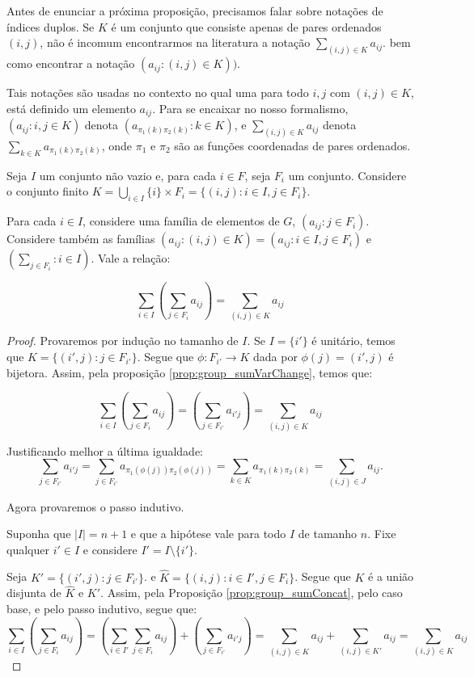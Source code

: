 Antes de enunciar a próxima proposição, precisamos falar sobre notações de índices duplos.
Se $K$ é um conjunto que consiste apenas de pares ordenados $(i, j)$, não é incomum encontrarmos na literatura a notação $\sum_{(i, j)\in K}a_{ij}$.
bem como encontrar a notação $(a_{ij}:(i, j)\in K))$.

Tais notações são usadas no contexto no qual uma para todo $i, j$ com $(i, j)\in K$, está definido um elemento $a_{ij}$.
Para se encaixar no nosso formalismo, $(a_{ij}:i, j \in K)$ denota $(a_{\pi_1(k)\pi_2(k)}: k \in K)$, e $\sum_{(i, j)\in K}a_{ij}$ denota $\sum_{k \in K}a_{\pi_1(k)\pi_2(k)}$, onde $\pi_1$ e $\pi_2$ são as funções coordenadas de pares ordenados.

\begin{prop}\label{prop:group_sumConcatII}
    Seja $I$ um conjunto não vazio e, para cada $i \in F$, seja $F_i$ um conjunto.
    Considere o conjunto finito $K=\bigcup_{i \in I}\{i\}\times F_i=\{(i, j): i \in I, j \in F_i\}$.

    Para cada $i \in I$, considere uma família de elementos de $G$, $(a_{ij}: j \in F_i)$.
    Considere também as famílias $(a_{ij}: (i, j)\in K)=(a_{ij}: i\in I, j \in F_i)$ e $(\sum_{j \in F_i}: i\in I)$. Vale a relação:

    \[\sum_{i \in I}\left(\sum_{j \in F_i}a_{ij}\right)=\sum_{(i, j)\in K}a_{ij}\]
\end{prop}
\begin{proof}
    Provaremos por indução no tamanho de $I$.
    Se $I=\{i'\}$ é unitário, temos que $K=\{(i', j): j \in F_{i'}\}$.
    Segue que $\phi:F_{i'}\rightarrow K$ dada por $\phi(j)=(i', j)$ é bijetora.
    Assim, pela proposição \ref{prop:group_sumVarChange}, temos que:

    \[\sum_{i \in I}\left(\sum_{j \in F_i}a_{ij}\right)=\left(\sum_{j \in F_{i'}}a_{i'j}\right)=\sum_{(i, j)\in K}a_{ij}\]

    Justificando melhor a última igualdade:
    \[\sum_{j \in F_{i'}}a_{i'j}=\sum_{j \in F_{i'}}a_{\pi_1(\phi(j))\pi_2(\phi(j))}=\sum_{k \in K}a_{\pi_1(k)\pi_2(k)}=\sum_{(i, j)\in J}a_{ij}.\]
    
    Agora provaremos o passo indutivo.

    Suponha que $|I|=n+1$ e que a hipótese vale para todo $I$ de tamanho $n$. Fixe qualquer $i' \in I$ e considere $I'=I\setminus \{i'\}$.

    Seja $K'=\{(i', j): j \in F_{i'}\}$. e $\hat K=\{(i, j): i \in I', j \in F_i\}$.
    Segue que $K$ é a união disjunta de $\hat K$ e $K'$.
    Assim, pela Proposição \ref{prop:group_sumConcat}, pelo caso base, e pelo passo indutivo, segue que:
    \[\sum_{i \in I}\left(\sum_{j \in F_i}a_{ij}\right)=\left(\sum_{i \in I'}\sum_{j \in F_{i}}a_{ij}\right)+\left(\sum_{j \in F_{i'}}a_{i'j}\right)=\sum_{(i, j)\in \hat K}a_{ij}+\sum_{(i, j)\in K'}a_{ij}=\sum_{(i, j)\in K}a_{ij}\]
\end{proof}

